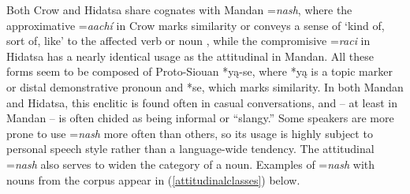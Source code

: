 Both Crow and Hidatsa share cognates with Mandan =\textit{nash}, where the approximative =\textit{aachí} in Crow marks similarity or conveys a sense of `kind of, sort of, like' to the affected verb or noun \citep[44]{graczyk2007}, while the compromisive =\textit{raci} in Hidatsa has a nearly identical usage as the attitudinal in Mandan. All these forms seem to be composed of Proto-Siouan *yą-se, where *yą is a topic marker or distal demonstrative pronoun and *se, which marks similarity. In both Mandan and Hidatsa, this enclitic is found often in casual conversations, and -- at least in Mandan -- is often chided as being informal or ``slangy.'' Some speakers are more prone to use =\textit{nash} more often than others, so its usage is highly subject to personal speech style rather than a language-wide tendency. The attitudinal =\textit{nash} also serves to widen the category of a noun. Examples of =\textit{nash} with nouns from the corpus appear in (\ref{attitudinalclasses}) below.

